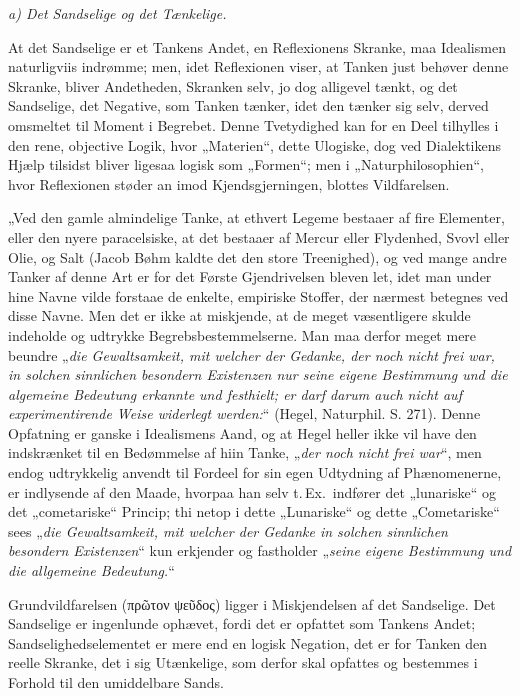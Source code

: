 \documentclass[12pt]{book}
\newcommand{\opage}[1]{\marginnote{\footnotesize\textit{[#1]}}}
\begin{document}
\emph{a) Det Sandselige og det Tænkelige.}

At det Sandselige er et Tankens Andet, en Reflexionens Skranke, maa Idealismen
naturligviis indrømme; men, idet Reflexionen viser, at Tanken just behøver denne
Skranke, bliver Andetheden, Skranken selv, jo dog alligevel tænkt, og det Sandselige,
det Negative, som Tanken tænker, idet den tænker sig selv, derved omsmeltet til Moment
i Begrebet. Denne Tvetydighed kan for en Deel tilhylles i den rene, objective Logik,
hvor „Materien“, dette Ulogiske, dog ved Dialektikens Hjælp tilsidst bliver ligesaa
logisk som „Formen“; men i „Naturphilosophien“, hvor Reflexionen støder an imod
Kjendsgjerningen, blottes Vildfarelsen.

„Ved den gamle almindelige Tanke, at ethvert Legeme bestaaer af fire Elementer, eller
den nyere paracelsiske, at det bestaaer af Mercur eller Flydenhed, Svovl eller Olie,
og Salt (Jacob Bøhm kaldte det den store Treenighed), og ved mange andre Tanker af
denne Art er for det Første Gjendrivelsen bleven let, idet man under hine Navne vilde
forstaae de enkelte, empiriske Stoffer, der nærmest betegnes ved disse Navne. Men det
er ikke at miskjende, at de meget væsentligere skulde indeholde og udtrykke
Begrebsbestemmelserne. Man maa derfor meget mere beundre
„\textit{die Gewaltsamkeit, mit welcher der Gedanke, der noch nicht frei war, in
solchen sinnlichen besondern Existenzen nur seine eigene Bestimmung und die algemeine
Bedeutung erkannte und festhielt; er darf darum auch nicht auf experimentirende Weise
widerlegt werden:}“ (Hegel, Naturphil. S. 271).
\opage{47} Denne Opfatning er ganske i Idealismens Aand, og at Hegel heller ikke vil have den
indskrænket til en Bedømmelse af hiin Tanke, „\textit{der noch nicht frei war}“, men
endog udtrykkelig anvendt til Fordeel for sin egen Udtydning af Phænomenerne, er
indlysende af den Maade, hvorpaa han selv t.\,Ex.\ indfører det „lunariske“ og det
„cometariske“ Princip; thi netop i dette „Lunariske“ og dette „Cometariske“ sees
„\textit{die Gewaltsamkeit, mit welcher der Gedanke in solchen sinnlichen besondern
Existenzen}“ kun erkjender og fastholder „\textit{seine eigene Bestimmung und die
allgemeine Bedeutung.}“

Grundvildfarelsen (πρῶτον ψεῦδος) ligger i Miskjendelsen af det Sandselige. Det
Sandselige er ingenlunde ophævet, fordi det er opfattet som Tankens Andet;
Sandselighedselementet er mere end en logisk Negation, det er for Tanken den reelle
Skranke, det i sig Utænkelige, som derfor skal opfattes og bestemmes i Forhold til den
umiddelbare Sands.
\end{document}
